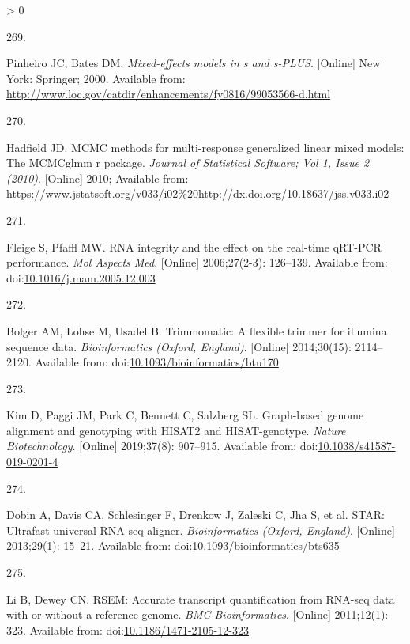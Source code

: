 \documentclass[twoside,10pt]{gihclass} %
\newlength{\cslhangindent}
\newlength{\csllabelwidth}
\newenvironment{CSLReferences}[3] %
 {%
  \setlength{\parindent}{0pt}
  \ifodd #1 \everypar{\setlength{\hangindent}{\cslhangindent}}\ignorespaces\fi
  \ifnum #2 > 0
  \setlength{\parskip}{#2\baselineskip}
  \fi
 }%
 {}
\newcommand{\CSLLeftMargin}[1]{\parbox[t]{\maxof{\widthof{#1}}{\csllabelwidth}}{#1}}
\newcommand{\CSLRightInline}[1]{\parbox[t]{\linewidth}{#1}}
\begin{document}
\begin{CSLReferences}{0}{0}
\leavevmode\hypertarget{ref-RN1986}{}%
\CSLLeftMargin{269. }
\CSLRightInline{Pinheiro JC, Bates DM. \emph{Mixed-effects models in s and s-PLUS}. {[}Online{]} New York: Springer; 2000. Available from: \url{http://www.loc.gov/catdir/enhancements/fy0816/99053566-d.html}}

\leavevmode\hypertarget{ref-RN1992}{}%
\CSLLeftMargin{270. }
\CSLRightInline{Hadfield JD. MCMC methods for multi-response generalized linear mixed models: The MCMCglmm r package. \emph{Journal of Statistical Software; Vol 1, Issue 2 (2010)}. {[}Online{]} 2010; Available from: \url{https://www.jstatsoft.org/v033/i02\%20http://dx.doi.org/10.18637/jss.v033.i02}}

\leavevmode\hypertarget{ref-RN2248}{}%
\CSLLeftMargin{271. }
\CSLRightInline{Fleige S, Pfaffl MW. RNA integrity and the effect on the real-time qRT-PCR performance. \emph{Mol Aspects Med}. {[}Online{]} 2006;27(2-3): 126--139. Available from: doi:\href{https://doi.org/10.1016/j.mam.2005.12.003}{10.1016/j.mam.2005.12.003}}

\leavevmode\hypertarget{ref-RN2382}{}%
\CSLLeftMargin{272. }
\CSLRightInline{Bolger AM, Lohse M, Usadel B. Trimmomatic: A flexible trimmer for illumina sequence data. \emph{Bioinformatics (Oxford, England)}. {[}Online{]} 2014;30(15): 2114--2120. Available from: doi:\href{https://doi.org/10.1093/bioinformatics/btu170}{10.1093/bioinformatics/btu170}}

\leavevmode\hypertarget{ref-RN2385}{}%
\CSLLeftMargin{273. }
\CSLRightInline{Kim D, Paggi JM, Park C, Bennett C, Salzberg SL. Graph-based genome alignment and genotyping with HISAT2 and HISAT-genotype. \emph{Nature Biotechnology}. {[}Online{]} 2019;37(8): 907--915. Available from: doi:\href{https://doi.org/10.1038/s41587-019-0201-4}{10.1038/s41587-019-0201-4}}

\leavevmode\hypertarget{ref-RN2386}{}%
\CSLLeftMargin{274. }
\CSLRightInline{Dobin A, Davis CA, Schlesinger F, Drenkow J, Zaleski C, Jha S, et al. STAR: Ultrafast universal RNA-seq aligner. \emph{Bioinformatics (Oxford, England)}. {[}Online{]} 2013;29(1): 15--21. Available from: doi:\href{https://doi.org/10.1093/bioinformatics/bts635}{10.1093/bioinformatics/bts635}}

\leavevmode\hypertarget{ref-RN2387}{}%
\CSLLeftMargin{275. }
\CSLRightInline{Li B, Dewey CN. RSEM: Accurate transcript quantification from RNA-seq data with or without a reference genome. \emph{BMC Bioinformatics}. {[}Online{]} 2011;12(1): 323. Available from: doi:\href{https://doi.org/10.1186/1471-2105-12-323}{10.1186/1471-2105-12-323}}


\end{CSLReferences}
\end{document}
